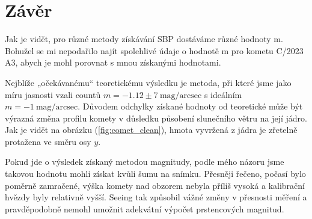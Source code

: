 \documentclass[a4paper,11pt,twocolumn]{article}
\begin{document}
    \section{Závěr}
        Jak je vidět, pro různé metody získávání SBP dostáváme různé hodnoty m. Bohužel se mi nepodařilo najít spolehlivé údaje o hodnotě m pro kometu C/2023 A3, abych je mohl porovnat s mnou získanými hodnotami.

        Nejblíže „očekávanému“ teoretickému výsledku je metoda, při které jsme jako míru jasnosti vzali countů $m = -1.12 \pm 7 ~ \text{mag/arcsec}$ s ideálním $m = -1 ~ \text{mag/arcsec}$. Důvodem odchylky získané hodnoty od teoretické může být výrazná změna profilu komety v důsledku působení slunečního větru na její jádro. Jak je vidět na obrázku (\ref{fig:comet_clean}), hmota vyvržená z jádra je zřetelně protažena ve směru osy $y$.

        Pokud jde o výsledek získaný metodou magnitudy, podle mého názoru jsme takovou hodnotu mohli získat kvůli šumu na snímku. Přesněji řečeno, počasí bylo poměrně zamračené, výška komety nad obzorem nebyla příliš vysoká a kalibrační hvězdy byly relativně vyšší. Seeing tak způsobil vážné změny v přesnosti měření a pravděpodobně nemohl umožnit adekvátní výpočet prstencových magnitud.

    
    \nocite{*}
    
\end{document}
